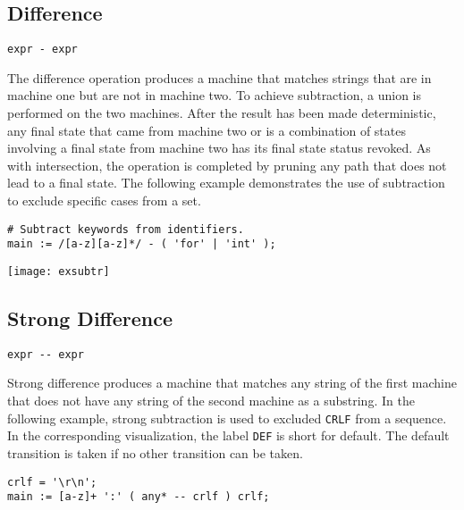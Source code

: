\documentclass[letterpaper,11pt,oneside]{book}
\newcommand{\verbspace}{\vspace{10pt}}
\newcommand{\graphspace}{\vspace{10pt}}
\newenvironment{inline_code}{\def\baselinestretch{1}\vspace{12pt}\small}{}
\begin{document}
\subsection{Difference}

\verb|expr - expr|
\verbspace

The difference operation produces a machine that matches
strings that are in machine one but are not in machine two. To achieve subtraction,
a union is performed on the two machines. After the result has been made
deterministic, any final state that came from machine two or is a combination
of states involving a final state from machine two has its final state status
revoked. As with intersection, the operation is completed by pruning any path
that does not lead to a final state.  The following example demonstrates the
use of subtraction to exclude specific cases from a set.

\verbspace

% GENERATE: exsubtr
\begin{inline_code}
\begin{verbatim}
# Subtract keywords from identifiers.
main := /[a-z][a-z]*/ - ( 'for' | 'int' );
\end{verbatim}
\end{inline_code}

\graphspace
\begin{center}
\texttt{[image: exsubtr]}
\end{center}
\graphspace

\subsection{Strong Difference}
\label{strong_difference}

\verb|expr -- expr|
\verbspace

Strong difference produces a machine that matches any string of the first
machine that does not have any string of the second machine as a substring. In
the following example, strong subtraction is used to excluded \verb|CRLF| from
a sequence. In the corresponding visualization, the label \verb|DEF| is short
for default. The default transition is taken if no other transition can be
taken.

\begin{inline_code}
\begin{verbatim}
crlf = '\r\n';
main := [a-z]+ ':' ( any* -- crlf ) crlf;
\end{verbatim}
\end{inline_code}
\end{document}
